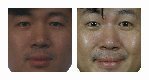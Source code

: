 \begin{figure}
\begin{center}
{\includegraphics[width=\columnwidth/12]{ch5/figures/00029_940422_fa.png}
\includegraphics[width=\columnwidth/12]{ch5/figures/00029_940519_fa.png}
}
\end{center}
\end{figure}
